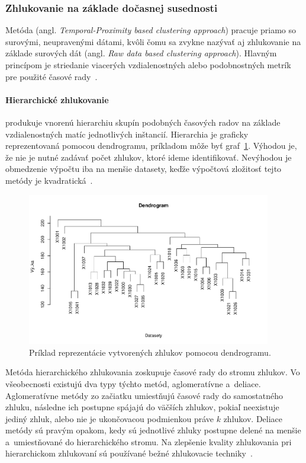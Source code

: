 \documentclass[a4paper,twoside,slovak,12pt,appendix]{article}
\begin{document}
\subsubsection{Zhlukovanie na základe dočasnej susednosti}
\label{c:raw-data-clustering}
Metóda (angl. \textit{Temporal-Proximity based clustering approach}) pracuje
priamo so surovými, neupravenými dátami, kvôli čomu sa zvykne nazývať aj
zhlukovanie na základe surových dát (angl. \textit{Raw data based clustering
approach}). Hlavným princípom je striedanie viacerých vzdialenostných alebo
podobnostných metrík pre použité časové rady~\cite{Rani2012}.

\label{c:hierarchical-clustering}
\paragraph{Hierarchické zhlukovanie} produkuje vnorenú hierarchiu skupín
podobných časových radov na základe vzdialenostných matíc jednotlivých
inštancií. Hierarchia je graficky reprezentovaná pomocou dendrogramu, príkladom
môže byť graf~\ref{fig:hierarchical-clustering}. Výhodou je, že nie je nutné
zadávať počet zhlukov, ktoré ideme identifikovať. Nevýhodou je obmedzenie
výpočtu iba na menšie datasety, keďže výpočtová zložitosť tejto metódy je
kvadratická~\cite{Dzeroski2007}.

\begin{figure}[htbp]
  \centering
  \includegraphics[width=0.95\textwidth]{hierarchical_clustering.pdf}
  \caption{Príklad reprezentácie vytvorených zhlukov pomocou dendrogramu.}
  \label{fig:hierarchical-clustering}
\end{figure}

Metóda hierarchického zhlukovania zoskupuje časové rady do stromu zhlukov. Vo
všeobecnosti existujú dva typy týchto metód, aglomeratívne a~deliace.
Aglomeratívne metódy zo začiatku umiestňujú časové rady do samostatného zhluku,
následne ich postupne spájajú do väčších zhlukov, pokiaľ neexistuje jediný
zhluk, alebo nie je ukončovacou podmienkou práve $k$ zhlukov. Deliace metódy sú
pravým opakom, kedy sú jednotlivé zhluky postupne delené na menšie
a~umiestňované do hierarchického stromu. Na zlepšenie kvality zhlukovania pri
hierarchickom zhlukovaní sú používané bežné zhlukovacie
techniky~\cite{WarrenLiao2005}.
\end{document}
